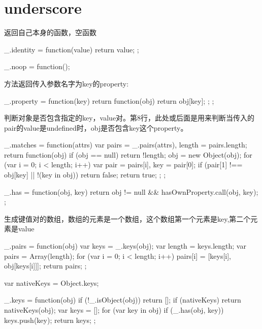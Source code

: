 \section{underscore}

返回自己本身的函数，空函数

\begin{JavaScript}
  _.identity = function(value) {
    return value;
  };
  
  _.noop = function(){};
\end{JavaScript}

方法返回传入参数名字为key的property:

\begin{JavaScript}
  _.property = function(key) {
    return function(obj) {
      return obj[key];
    };
  };
\end{JavaScript}

判断对象是否包含指定的key，value对。第8行，此处或后面是用来判断当传入的pair的value是undefined时，obj是否包含key这个property。

\begin{JavaScript}
  _.matches = function(attrs) {
    var pairs = _.pairs(attrs), length = pairs.length;
    return function(obj) {
      if (obj == null) return !length;
      obj = new Object(obj);
      for (var i = 0; i < length; i++) {
        var pair = pairs[i], key = pair[0];
        if (pair[1] !== obj[key] || !(key in obj)) return false;
      }
      return true;
    };
  };
  
  _.has = function(obj, key) {
    return obj != null && hasOwnProperty.call(obj, key);
  }; 
\end{JavaScript}

生成键值对的数组，数组的元素是一个数组，这个数组第一个元素是key,第二个元素是value

\begin{JavaScript}
  _.pairs = function(obj) {
    var keys = _.keys(obj);
    var length = keys.length;
    var pairs = Array(length);
    for (var i = 0; i < length; i++) {
      pairs[i] = [keys[i], obj[keys[i]]];
    }
    return pairs;
  };
\end{JavaScript}
\begin{JavaScript}
  var nativeKeys = Object.keys;
  
  _.keys = function(obj) {
    if (!_.isObject(obj)) return [];
    if (nativeKeys) return nativeKeys(obj);
    var keys = [];
    for (var key in obj) if (_.has(obj, key)) keys.push(key);
    return keys;
  };  
\end{JavaScript}

